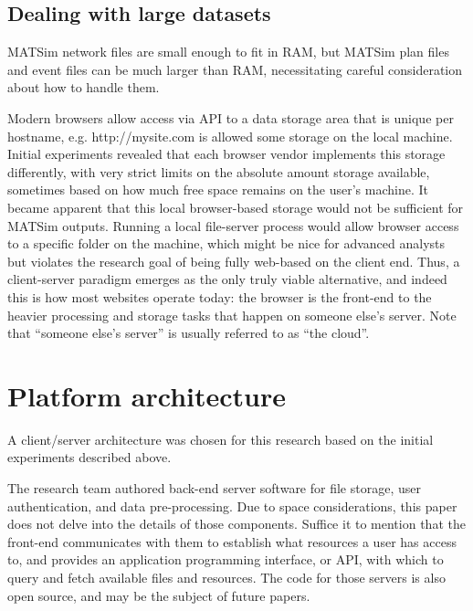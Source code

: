 \hypertarget{dealing-with-large-datasets}{%
\subsection{Dealing with large datasets}\label{dealing-with-large-datasets}}

MATSim network files are small enough to fit in RAM, but MATSim plan files and event files can be much larger than RAM, necessitating careful consideration about how to handle them.

Modern browsers allow access via API to a data storage area that is unique per hostname, e.g. http://mysite.com is allowed some storage on the local machine. Initial experiments revealed that each browser vendor implements this storage differently, with very strict limits on the absolute amount storage available, sometimes based on how much free space remains on the user's machine. It became apparent that this local browser-based storage would not be sufficient for MATSim outputs. Running a local file-server process would allow browser access to a specific folder on the machine, which might be nice for advanced analysts but violates the research goal of being fully web-based on the client end. Thus, a client-server paradigm emerges as the only truly viable alternative, and indeed this is how most websites operate today: the browser is the front-end to the heavier processing and storage tasks that happen on someone else's server. Note that ``someone else's server'' is usually referred to as ``the cloud''.

\hypertarget{mathub-platform-architecture}{%
\section{Platform architecture}\label{platform-architecture}}

A client/server architecture was chosen for this research based on the initial experiments described above.

The research team authored back-end server software for file storage, user authentication, and data pre-processing. Due to space considerations, this paper does not delve into the details of those components. Suffice it to mention that the front-end communicates with them to establish what resources a user has access to, and provides an application programming interface, or API, with which to query and fetch available files and resources. The code for those servers is also open source, and may be the subject of future papers.

